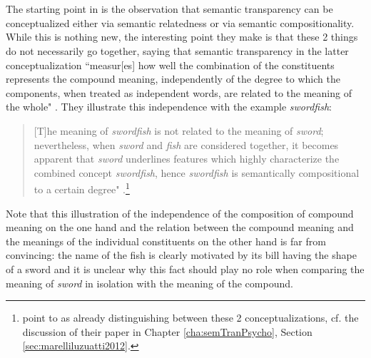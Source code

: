 \section{\citet{Marellietal:2014}}
\label{sec:marellietal2014}

The starting point in \citet{Marellietal:2014} is the observation that
semantic transparency can be conceptualized either via semantic
relatedness or via semantic compositionality. While this is nothing
new, the interesting point they make is that these 2 things do not
necessarily go together, saying that semantic transparency in the latter conceptualization
``measur[es] how well the combination of the constituents represents the
compound meaning, independently of the degree to which the components,
when treated as independent words, are related to the meaning of the
whole" \citep[1422]{Marellietal:2014}. They illustrate this independence
with the example \emph{swordfish}:
\begin{quotation}
[T]he meaning of \emph{swordfish}
is not related to the meaning of \emph{sword}; nevertheless, when
\emph{sword} and \emph{fish} are considered together, it becomes
apparent that \emph{sword} underlines features which highly
characterize the combined concept \emph{swordfish}, hence
\emph{swordfish} is semantically compositional to a certain degree" %
\citep[1422]{Marellietal:2014}.\footnote{\citet[2]{Marellietal:2014}
  point to \citet{MarelliandLuzzatti:2012} as already distinguishing
  between these 2 conceptualizations, cf. the discussion of their paper in Chapter \ref{cha:semTranPsycho}, Section \ref{sec:marelliluzuatti2012}. }
\end{quotation}
Note that this illustration of the independence of the composition of
compound meaning on the
one hand and the relation between the compound meaning and the
meanings of the individual constituents on the other hand is far from
convincing: the name of the fish is clearly motivated by its bill
having the shape of a sword and it is unclear why this fact should
play no role when comparing the meaning of \emph{sword} in isolation with the
meaning of the compound.

